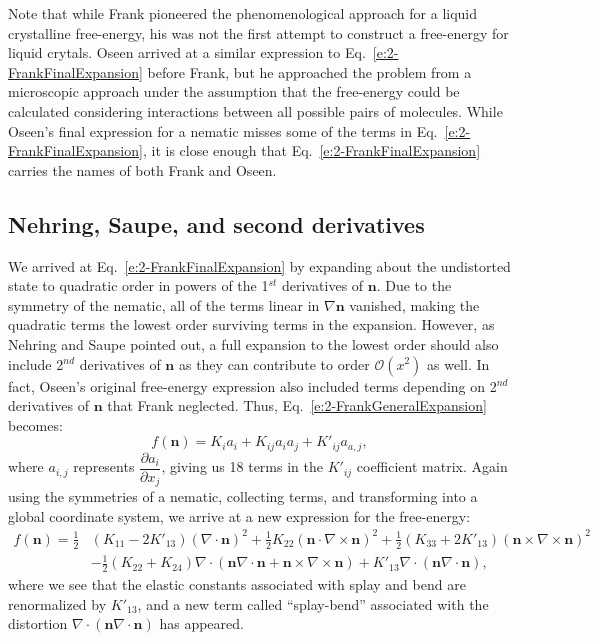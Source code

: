 Note that while Frank pioneered the phenomenological approach for a liquid crystalline free-energy, his was not the first attempt to construct a free-energy for liquid crytals.
Oseen arrived at a similar expression to Eq.~\ref{e:2-FrankFinalExpansion} before Frank, but he approached the problem from a microscopic approach under the assumption that the free-energy could be calculated considering interactions between all possible pairs of molecules.
While Oseen's final expression for a nematic misses some of the terms in Eq.~\ref{e:2-FrankFinalExpansion}, it is close enough that Eq.~\ref{e:2-FrankFinalExpansion} carries the names of both Frank and Oseen.


\subsection{Nehring, Saupe, and second derivatives}
We arrived at Eq.~\ref{e:2-FrankFinalExpansion} by expanding about the undistorted state to quadratic order in powers of the 1$^{st}$ derivatives of $\mathbf{n}$.
Due to the symmetry of the nematic, all of the terms linear in $\nabla \mathbf{n}$ vanished, making the quadratic terms the lowest order surviving terms in the expansion.
However, as Nehring and Saupe pointed out, a full expansion to the lowest order should also include 2$^{nd}$ derivatives of $\mathbf{n}$ as they can contribute to order $\mathcal{O}(x^2)$ as well.
In fact, Oseen's original free-energy expression also included terms depending on 2$^{nd}$ derivatives of $\mathbf{n}$ that Frank neglected.
Thus, Eq.~\ref{e:2-FrankGeneralExpansion} becomes:
\begin{equation}
  f(\mathbf{n}) = K_i a_i + K_{ij} a_i a_j + K'_{ij} a_{a,j},\label{e:2-NSGeneralExpansion}
\end{equation}
where $a_{i,j}$ represents $\dfrac{\partial a_i}{\partial x_j}$, giving us 18 terms in the $K'_{ij}$ coefficient matrix.
Again using the symmetries of a nematic, collecting terms, and transforming into a global coordinate system, we arrive at a new expression for the free-energy:
\begin{align}
  f(\mathbf{n}) = \frac{1}{2}&(K_{11} - 2K'_{13}) (\nabla \cdot \mathbf{n})^2 + \frac{1}{2}K_{22} (\mathbf{n} \cdot \nabla \times \mathbf{n})^2 + \frac{1}{2}(K_{33} + 2K'_{13}) (\mathbf{n} \times \nabla \times \mathbf{n})^2 \nonumber \\
    & - \frac{1}{2}(K_{22} + K_{24}) \nabla \cdot (\mathbf{n}\nabla \cdot \mathbf{n} + \mathbf{n} \times \nabla \times \mathbf{n})
      + K'_{13} \nabla \cdot (\mathbf{n} \nabla \cdot \mathbf{n}),\label{e:2-NSFinalExpansion}
\end{align}
where we see that the elastic constants associated with splay and bend are renormalized by $K'_{13}$, and a new term called ``splay-bend'' associated with the distortion $\nabla \cdot (\mathbf{n} \nabla \cdot \mathbf{n})$ has appeared. \\

